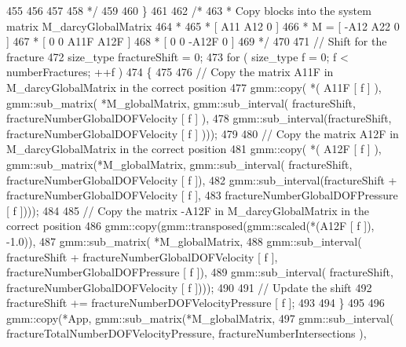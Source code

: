 \begin{DoxyCode}
455 \textcolor{comment}{        }
456 \textcolor{comment}{        }
457 \textcolor{comment}{}
458 \textcolor{comment}{     */}  
459         
460     \}
461     
462     \textcolor{comment}{/*}
463 \textcolor{comment}{     *      Copy blocks into the system matrix M\_darcyGlobalMatrix}
464 \textcolor{comment}{     *      }
465 \textcolor{comment}{     *              [  A11  A12  0          ]}
466 \textcolor{comment}{     *          M = [ -A12  A22  0          ]}
467 \textcolor{comment}{     *              [  0    0    A11F  A12F ]}
468 \textcolor{comment}{     *              [  0    0   -A12F  0    ]       }
469 \textcolor{comment}{     */} 
470  
471     \textcolor{comment}{// Shift for the fracture}
472     size\_type fractureShift = 0;
473     \textcolor{keywordflow}{for} ( size\_type f = 0; f < numberFractures; ++f )
474     \{
475 
476         \textcolor{comment}{// Copy the matrix A11F in M\_darcyGlobalMatrix in the correct position}
477         gmm::copy( *( A11F [ f ] ), gmm::sub\_matrix( *M\_globalMatrix, gmm::sub\_interval( fractureShift, 
      fractureNumberGlobalDOFVelocity [ f ] ),
478                                                                      gmm::sub\_interval(fractureShift, 
      fractureNumberGlobalDOFVelocity [ f ] )));
479 
480         \textcolor{comment}{// Copy the matrix A12F in M\_darcyGlobalMatrix in the correct position}
481         gmm::copy( *( A12F [ f ] ), gmm::sub\_matrix(*M\_globalMatrix, gmm::sub\_interval( fractureShift, 
      fractureNumberGlobalDOFVelocity [ f ]),
482                                                                   gmm::sub\_interval(fractureShift + 
      fractureNumberGlobalDOFVelocity [ f ], 
483                                                                                     
      fractureNumberGlobalDOFPressure [ f ])));
484 
485         \textcolor{comment}{// Copy the matrix -A12F in M\_darcyGlobalMatrix in the correct position}
486         gmm::copy(gmm::transposed(gmm::scaled(*(A12F [ f ]), -1.0)), 
487                                   gmm::sub\_matrix( *M\_globalMatrix, 
488                                           gmm::sub\_interval( fractureShift + 
      fractureNumberGlobalDOFVelocity [ f ], fractureNumberGlobalDOFPressure [ f ]), 
489                                           gmm::sub\_interval( fractureShift, fractureNumberGlobalDOFVelocity
       [ f ])));
490    
491         \textcolor{comment}{// Update the shift}
492         fractureShift += fractureNumberDOFVelocityPressure [ f ];
493 
494     \}
495 
496     gmm::copy(*App, gmm::sub\_matrix(*M\_globalMatrix, 
497             gmm::sub\_interval( fractureTotalNumberDOFVelocityPressure, fractureNumberIntersections ), 

\end{DoxyCode}
